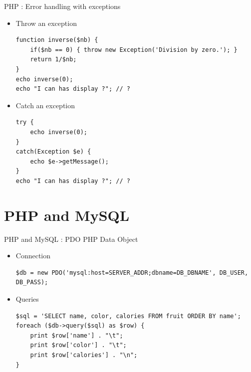 \documentclass{beamer}
\begin{document}
\begin{frame}[fragile]{PHP : Error handling with exceptions}
    \begin{itemize}
        \item Throw an exception
        \begin{lstlisting}
function inverse($nb) {
    if($nb == 0) { throw new Exception('Division by zero.'); }
    return 1/$nb;
}
echo inverse(0);
echo "I can has display ?"; // ?
        \end{lstlisting}
        \pause
        \item Catch an exception
        \begin{lstlisting}
try {
    echo inverse(0);
}
catch(Exception $e) {
    echo $e->getMessage();
}
echo "I can has display ?"; // ?
        \end{lstlisting}
    \end{itemize}
\end{frame}

\section{PHP and MySQL}

\begin{frame}[fragile]{PHP and MySQL : PDO}
    PHP Data Object
    
    \begin{itemize}
        \item Connection
            \begin{lstlisting}
$db = new PDO('mysql:host=SERVER_ADDR;dbname=DB_DBNAME', DB_USER, DB_PASS);
            \end{lstlisting}
        \item Queries
            \begin{lstlisting}
$sql = 'SELECT name, color, calories FROM fruit ORDER BY name';
foreach ($db->query($sql) as $row) {
    print $row['name'] . "\t";
    print $row['color'] . "\t";
    print $row['calories'] . "\n";
}
            \end{lstlisting}
    \end{itemize}
\end{frame}
\end{document}
